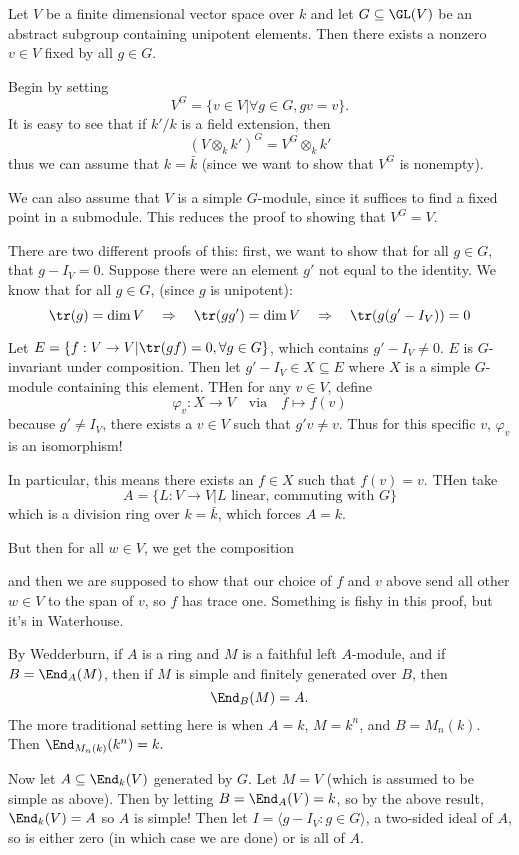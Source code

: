 \documentclass[12pt]{article}
\begin{document}
\begin{thm}
	Let $V$ be a finite dimensional vector space over $k$ and let $G\subseteq \GL(V)$ be an abstract subgroup containing unipotent elements.
	Then there exists a nonzero $v\in V$ fixed by all $g\in G$.
\end{thm}
\begin{prf}
	Begin by setting 
	\[V^G=\{v\in V|\forall g\in G, gv=v\}.\]
	It is easy to see that if $k'/k$ is a field extension, then 
	\[(V\otimes_k k')^G=V^G\otimes_k k'\]
	thus we can assume that $k=\bar k$ (since we want to show that $V^G$ is nonempty).

	We can also assume that $V$ is a simple $G$-module, since it suffices to find a fixed point in a submodule.
	This reduces the proof to showing that $V^G=V$.

	There are two different proofs of this: first, we want to show that for all $g\in G$, that $g-I_V=0$. Suppose there were 
	an element $g'$ not equal to the identity. We know that for all $g\in G$, (since $g$ is unipotent):
	\[\tr (g)=\dim V\quad\Rightarrow\quad \tr(gg')=\dim V\quad\Rightarrow\quad \tr(g(g'-I_V))=0\]
	
	Let $E=\{f:V\to V|\tr(gf)=0,\forall g\in G\}$, which contains $g'-I_V\ne 0$. $E$ is $G$-invariant under composition.
	Then let $g'-I_V\in X\subseteq E$ where $X$ is a simple $G$-module containing this element. THen for any $v\in V$, define 
	\[\varphi_v:X\to V\quad\text{via}\quad f\mapsto f(v)\]
	because $g'\ne I_V$, there exists a $v\in V$ such that $g'v\ne v$. Thus for this specific $v$, $\varphi_v$ is an isomorphism!

	In particular, this means there exists an $f\in X$ such that $f(v)=v$. THen take 
	\[A=\{L:V\to V| L\text{ linear, commuting with $G$}\}\]
	which is a division ring over $k=\bar k$, which forces $A=k$.

	But then for all $w\in V$, we get the composition 
	\begin{center}
	\end{center}
	and then we are supposed to show that our choice of $f$ and $v$ above send all other $w\in V$ to the span of $v$,
	so $f$ has trace one. Something is fishy in this proof, but it's in Waterhouse.
\end{prf}
\begin{prf}
	By Wedderburn, if $A$ is a ring and $M$ is a faithful left $A$-module, and if $B=\End_A(M)$, then if $M$ is simple and finitely generated over $B$, 
	then 
	\[\End_B(M)=A.\]
	The more traditional setting here is when $A=k$, $M=k^n$, and $B=M_n(k)$. Then $\End_{M_n(k)}(k^n)=k.$

	Now let $A\subseteq \End_k(V)$ generated by $G$. Let $M=V$ (which is assumed to be simple as above). Then by letting $B=\End_A(V)=k$, so by the above 
	result, $\End_k(V)=A$ so $A$ is simple! Then let $I=\langle g-I_V:g\in G\rangle$, a two-sided ideal of $A$, so is either zero (in which case we are done) or is all of $A$.
\end{prf}
\end{document}
